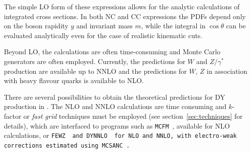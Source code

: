 The simple LO form of these expressions allows for the analytic calculations of integrated
cross sections.
In both NC and CC expressions the PDFs depend only on the boson rapidity \(y\) and
invariant mass \(m\), while
the integral in \(\cos\theta\) can be evaluated analytically
even for the case of realistic kinematic cuts.
%

Beyond LO, the calculations are often time-consuming and Monte Carlo generators are often employed. 
Currently, the predictions for $W$ and $Z/\gamma^*$ production are available up
to NNLO and the predictions for $W$, $Z$ in association with heavy flavour quarks is available to NLO.

There are several possibilities to obtain the theoretical
predictions for DY production in \fitter. 
The NLO and NNLO calculations are time consuming
and $k$-factor or \emph{fast grid} techniques must be employed (see section~\ref{sec:techniques}
for details), which are interfaced to programs such as
\texttt{MCFM}~\cite{Campbell:1999ah,Campbell:2000je,Campbell:2010ff}, 
available for NLO calculations, or 
\tt FEWZ\rm~\cite{FEWZ} and \tt DYNNLO\rm~\cite{DYNNLO} for NLO and NNLO, with electro-weak corrections estimated using \tt MCSANC\rm~\cite{Bardin:2012jk, Bondarenko:2013nu}.
 





